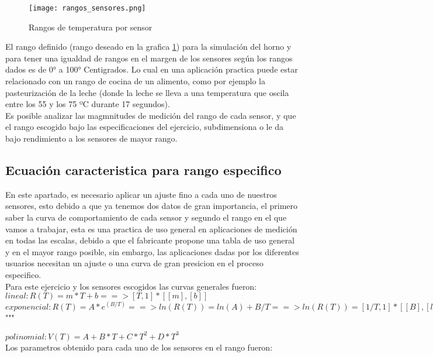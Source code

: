 \documentclass[conference]{IEEEtran}
\begin{document}
\begin{figure}[h!]
	\centering
	\texttt{[image: rangos\_sensores.png]}
	\caption{Rangos de temperatura por sensor}
	\label{fig:5}
\end{figure}

El rango definido (rango deseado en la grafica \ref{fig:5}) para la simulación del horno y para tener una igualdad de rangos en el margen de los sensores según los rangos dados es de 0° a 100° Centigrados. Lo cual en una aplicación practica puede estar relacionado con un rango de cocina de un alimento, como por ejemplo la pasteurización de la leche (donde la leche se lleva a una temperatura que oscila entre los 55 y los 75 ºC durante 17 segundos).\\

Es posible analizar las magmnitudes de medición del rango de cada sensor, y que el rango escogido bajo las especificaciones del ejercicio, subdimensiona o le da bajo rendimiento a los sensores de mayor rango.


\subsection{Ecuación caracteristica para rango especifico}

En este apartado, es necesario aplicar un ajuste fino a cada uno de nuestros sensores, esto debido a que ya tenemos dos datos de gran importancia, el primero saber la curva de comportamiento de cada sensor y segundo el rango en el que vamos a trabajar, esta es una practica de uso general en aplicaciones de medición en todas las escalas, debido a que el fabricante propone una tabla de uso general y en el mayor rango posible, sin embargo, las aplicaciones dadas por los diferentes usuarios necesitan un ajuste o una curva de gran presicion en el proceso especifico.\\

Para este ejercicio y los sensores escogidos las curvas generales fueron:\\

$lineal: R(T) = m*T + b ==> [T, 1] * [[m], [b]]$\\

$exponencial: R(T) = A * e^(B/T) ==> ln(R(T)) = ln(A) + B/T ==> ln(R(T)) = [1/T, 1] * [[B], [ln(A)]]$\\
"""

$polinomial: V(T) = A + B * T + C * T^2 + D * T^3$\\

Los parametros obtenido para cada uno de los sensores en el rango fueron:
\end{document}
